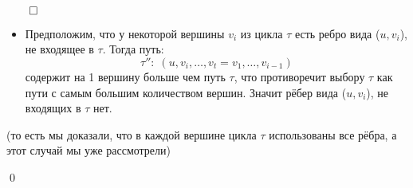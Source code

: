 \documentclass[a4paper,12pt,leqno]{article}
\theoremstyle{plain} %
\theoremstyle{definition} %
\renewenvironment{proof}{$\qed$}{{\qed}} %
\begin{document}
\begin{proof}
\begin{itemize}
\begin{itemize}
    \item Предположим, что у некоторой вершины $v_i$ из цикла $\tau$ есть ребро вида ($u, v_i$), не входящее в $\tau$. Тогда путь:
    \[
    \tau'': \; (u, v_i, \ldots, v_t=v_1, \ldots, v_{i-1})
    \]
    содержит на 1 вершину больше чем путь $\tau$, что противоречит выбору $\tau$ как пути с самым большим количеством вершин. Значит рёбер вида ($u, v_i$), не входящих в $\tau$ нет.
    \end{itemize}
    
    (то есть мы доказали, что в каждой вершине цикла $\tau$ использованы все рёбра, а этот случай мы уже рассмотрели)
\end{itemize}

\end{proof}
\end{document}
